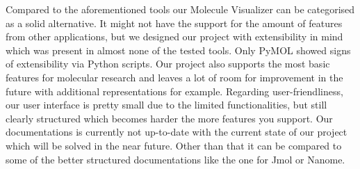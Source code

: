 Compared to the aforementioned tools our Molecule Visualizer can be categorised as a solid alternative. It might not have the support for the amount of features from other applications, but we designed our project with extensibility in mind which was present in almost none of the tested tools. Only PyMOL showed signs of extensibility via Python scripts. Our project also supports the most basic features for molecular research and leaves a lot of room for improvement in the future with additional representations for example. Regarding user-friendliness, our user interface is pretty small due to the limited functionalities, but still clearly structured which becomes harder the more features you support. Our documentations is currently not up-to-date with the current state of our project which will be solved in the near future. Other than that it can be compared to some of the better structured documentations like the one for Jmol or Nanome.